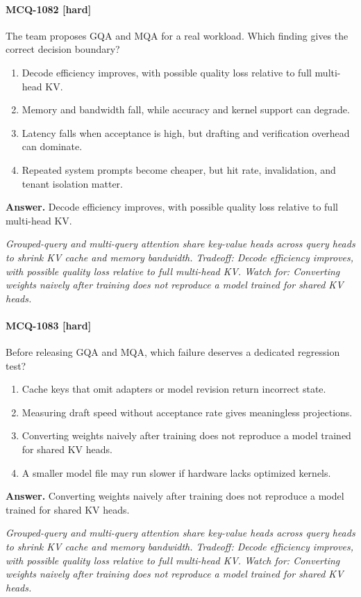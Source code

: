 \paragraph{MCQ-1082 [hard]} The team proposes GQA and MQA for a real workload. Which finding gives the correct decision boundary?
\begin{enumerate}[label=\Alph*.]
\item Decode efficiency improves, with possible quality loss relative to full multi-head KV.
\item Memory and bandwidth fall, while accuracy and kernel support can degrade.
\item Latency falls when acceptance is high, but drafting and verification overhead can dominate.
\item Repeated system prompts become cheaper, but hit rate, invalidation, and tenant isolation matter.
\end{enumerate}
\noindent\textbf{Answer.} Decode efficiency improves, with possible quality loss relative to full multi-head KV.
\par\textit{Grouped-query and multi-query attention share key-value heads across query heads to shrink KV cache and memory bandwidth. Tradeoff: Decode efficiency improves, with possible quality loss relative to full multi-head KV. Watch for: Converting weights naively after training does not reproduce a model trained for shared KV heads.}
\paragraph{MCQ-1083 [hard]} Before releasing GQA and MQA, which failure deserves a dedicated regression test?
\begin{enumerate}[label=\Alph*.]
\item Cache keys that omit adapters or model revision return incorrect state.
\item Measuring draft speed without acceptance rate gives meaningless projections.
\item Converting weights naively after training does not reproduce a model trained for shared KV heads.
\item A smaller model file may run slower if hardware lacks optimized kernels.
\end{enumerate}
\noindent\textbf{Answer.} Converting weights naively after training does not reproduce a model trained for shared KV heads.
\par\textit{Grouped-query and multi-query attention share key-value heads across query heads to shrink KV cache and memory bandwidth. Tradeoff: Decode efficiency improves, with possible quality loss relative to full multi-head KV. Watch for: Converting weights naively after training does not reproduce a model trained for shared KV heads.}
